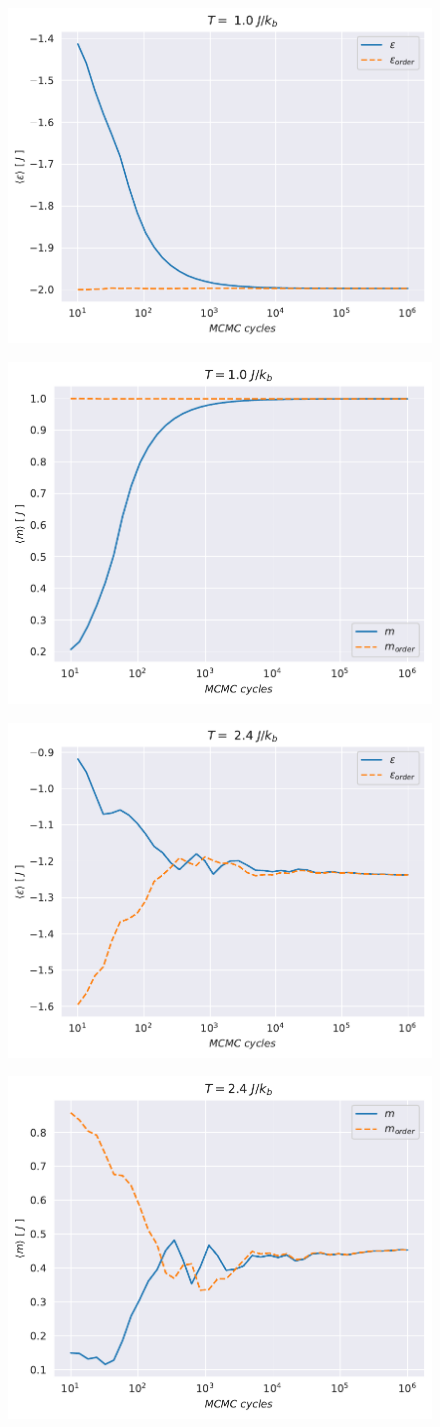 \documentclass[english,notitlepage,reprint,nofootinbib]{revtex4-1}  %
\begin{document}
\begin{figure}[H]
    \centering
    \includegraphics[width=.5\textwidth]{../figures/numeric_L_20_T_1_e.pdf}
    \caption{}
    \label{fig:numeric_L_20_T_1_e}
\end{figure}

\begin{figure}[H]
    \centering
    \includegraphics[width=.5\textwidth]{../figures/numeric_L_20_T_1_m.pdf}
    \caption{}
    \label{fig:numeric_L_20_T_1_m}
\end{figure}

\begin{figure}[H]
    \centering
    \includegraphics[width=.5\textwidth]{../figures/numeric_L_20_T_2_4_e.pdf}
    \caption{}
    \label{fig:numeric_L_20_T_2_4_e}
\end{figure}

\begin{figure}[H]
    \centering
    \includegraphics[width=.5\textwidth]{../figures/numeric_L_20_T_2_4_m.pdf}
    \caption{}
    \label{fig:numeric_L_20_T_2_4_m}
\end{figure}
\end{document}
